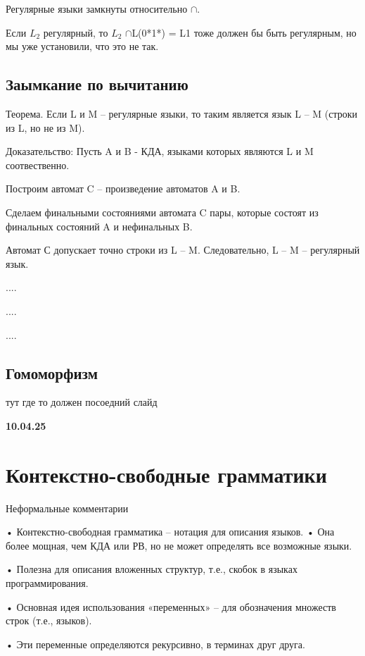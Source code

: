 \documentclass{article}
\begin{document}
Регулярные языки замкнуты относительно $\cap$.

Если $L_2$ регулярный, то $L_2$ $\cap$L(0*1*) = L1
тоже должен бы быть регулярным, но мы уже установили, что это не
так.

\subsection{Заымкание по вычитанию}

Теорема. Если L и M – регулярные языки, то таким является
язык L – M (строки из L, но не из M).

Доказательство: Пусть A и B - КДА, языками которых
являются L и M соотвественно.

Построим автомат C – произведение автоматов A и B.

Сделаем финальными состояниями автомата C пары,
которые состоят из финальных состояний A и нефинальных
B.

Автомат С допускает точно строки из L – M.
Следовательно, L – M – регулярный язык.


....


....


....
\subsection{Гомоморфизм}



тут где то должен посоедний слайд


\vspace{1cm}

\textbf{10.04.25}

\section{Контекстно-свободные грамматики}



Неформальные комментарии

• Контекстно-свободная грамматика – нотация для описания языков.
• Она более мощная, чем КДА или РВ, но не может определять все
возможные языки.

• Полезна для описания вложенных структур, т.е., скобок в языках
программирования.

• Основная идея использования «переменных» – для обозначения
множеств строк (т.е., языков).

• Эти переменные определяются рекурсивно, в терминах друг друга.
\end{document}
